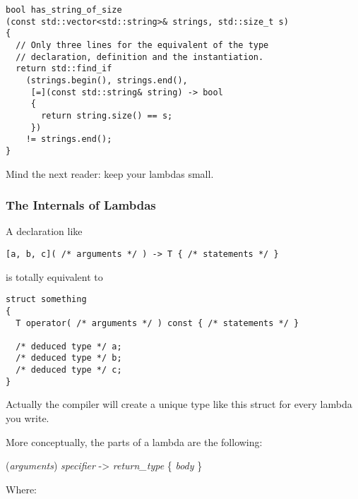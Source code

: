 \begin{lstlisting}
bool has_string_of_size
(const std::vector<std::string>& strings, std::size_t s)
{
  // Only three lines for the equivalent of the type
  // declaration, definition and the instantiation.
  return std::find_if
    (strings.begin(), strings.end(),
     [=](const std::string& string) -> bool
     {
       return string.size() == s;
     })
    != strings.end();
}
\end{lstlisting}

\begin{guideline}
  Mind the next reader: keep your lambdas small.
\end{guideline}

\subsubsection{The Internals of Lambdas}
\label{lambdas-internals}

A declaration like

\begin{lstlisting}
[a, b, c]( /* arguments */ ) -> T { /* statements */ }
\end{lstlisting}

is totally equivalent to

\begin{lstlisting}
struct something
{
  T operator( /* arguments */ ) const { /* statements */ }

  /* deduced type */ a;
  /* deduced type */ b;
  /* deduced type */ c;
}
\end{lstlisting}

Actually the compiler will create a unique type like this struct for
every lambda you write.

More conceptually, the parts of a lambda are the following:

\bigskip

\indent [{\it capture}]({\it arguments}) {\it specifier} -\textgreater
        {\it return\_type} \{ {\it body} \}

\bigskip

Where:

